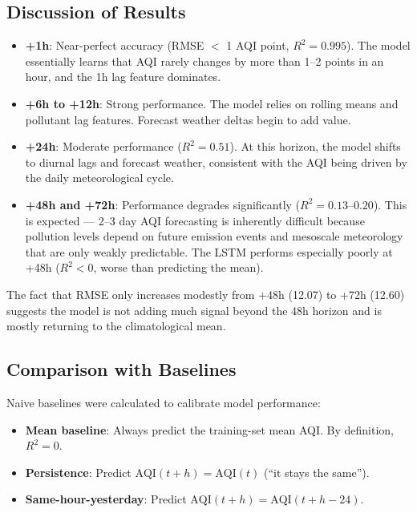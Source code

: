 \documentclass[12pt, a4paper]{article}
\begin{document}
\subsection{Discussion of Results}

\begin{itemize}
  \item \textbf{+1h}: Near-perfect accuracy (RMSE $<$ 1 AQI point, $R^2 = 0.995$).  The model essentially learns that AQI rarely changes by more than 1--2 points in an hour, and the 1h lag feature dominates.
  \item \textbf{+6h to +12h}: Strong performance.  The model relies on rolling means and pollutant lag features.  Forecast weather deltas begin to add value.
  \item \textbf{+24h}: Moderate performance ($R^2 = 0.51$).  At this horizon, the model shifts to diurnal lags and forecast weather, consistent with the AQI being driven by the daily meteorological cycle.
  \item \textbf{+48h and +72h}: Performance degrades significantly ($R^2 = 0.13$--$0.20$).  This is expected --- 2--3 day AQI forecasting is inherently difficult because pollution levels depend on future emission events and mesoscale meteorology that are only weakly predictable.  The LSTM performs especially poorly at +48h ($R^2 < 0$, worse than predicting the mean).
\end{itemize}

The fact that RMSE only increases modestly from +48h (12.07) to +72h (12.60) suggests the model is not adding much signal beyond the 48h horizon and is mostly returning to the climatological mean.

\subsection{Comparison with Baselines}

Naive baselines were calculated to calibrate model performance:

\begin{itemize}
  \item \textbf{Mean baseline}: Always predict the training-set mean AQI. By definition, $R^2 = 0$.
  \item \textbf{Persistence}: Predict $\text{AQI}(t+h) = \text{AQI}(t)$ (``it stays the same'').
  \item \textbf{Same-hour-yesterday}: Predict $\text{AQI}(t+h) = \text{AQI}(t+h-24)$.
\end{itemize}
\end{document}
